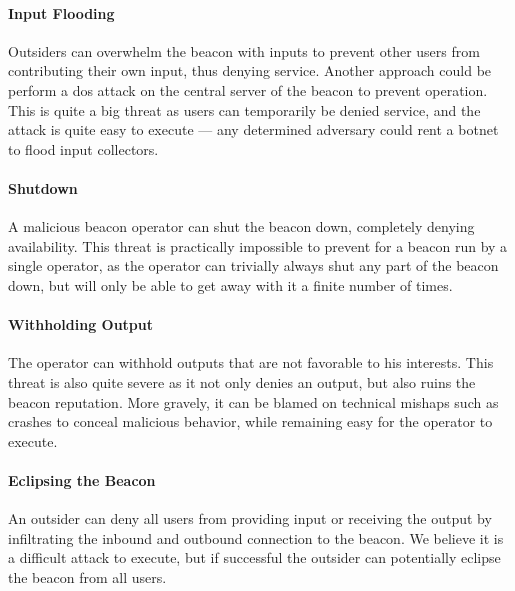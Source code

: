 \newcommand{\parathreat}[1]{\paragraph{#1}\hspace{-1ex}}

\parathreat{Input Flooding}
Outsiders can overwhelm the beacon with inputs to prevent other users from contributing their own input, thus denying service.
Another approach could be perform a \gls{dos} attack on the central server of the beacon to prevent operation.
This is quite a big threat as users can temporarily be denied service, and the attack is quite easy to execute --- any determined adversary could rent a botnet to flood input collectors.

\parathreat{Shutdown}
A malicious beacon operator can shut the beacon down, completely denying availability.
This threat is practically impossible to prevent for a beacon run by a single operator, as the operator can trivially always shut any part of the beacon down, but will only be able to get away with it a finite number of times.

\parathreat{Withholding Output}
The operator can withhold outputs that are not favorable to his interests.
This threat is also quite severe as it not only denies an output, but also ruins the beacon reputation.
More gravely, it can be blamed on technical mishaps such as crashes to conceal malicious behavior, while remaining easy for the operator to execute.

\parathreat{Eclipsing the Beacon}
An outsider can deny all users from providing input or receiving the output by infiltrating the inbound and outbound connection to the beacon.
We believe it is a difficult attack to execute, but if successful the outsider can potentially eclipse the beacon from all users.

